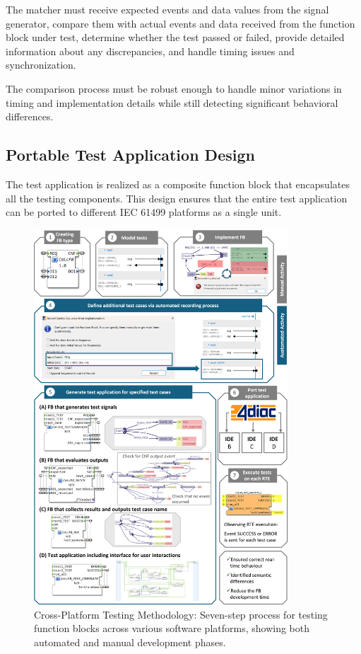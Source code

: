 The matcher must receive expected events and data values from the signal generator, compare them with actual events and data received from the function block under test, determine whether the test passed or failed, provide detailed information about any discrepancies, and handle timing issues and synchronization.

The comparison process must be robust enough to handle minor variations in timing and implementation details while still detecting significant behavioral differences.

\subsection{Portable Test Application Design}

The test application is realized as a composite function block that encapsulates all the testing components. This design ensures that the entire test application can be ported to different IEC 61499 platforms as a single unit.

\begin{figure}[!htbp]
    \centering
    \includegraphics[width=0.85\textwidth]{MX_Papers/Paper10/Figures/methodology_complete.png}
    \caption{Cross-Platform Testing Methodology: Seven-step process for testing function blocks across various software platforms, showing both automated and manual development phases.}
    \label{fig:cross_platform_methodology}
\end{figure}

